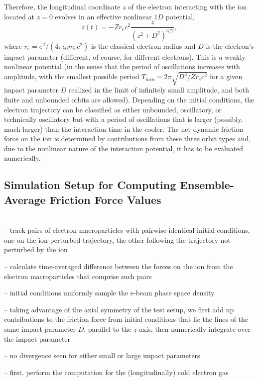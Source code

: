 \documentclass[12pt, reqno]{amsart}
\begin{document}
Therefore, the longitudinal coordinate $z$ of the electron interacting with the ion located at $z=0$ evolves in an effective nonlinear $1D$ potential, 
\begin{equation}
\ddot{z}(t) = - Zr_ec^2 \frac{z}{(z^2 +D^2)^{3/2}} ,
\end{equation}
where $r_e = e^2/(4 \pi \epsilon_0 m_e c^2)$ is the classical electron radius and $D$ is the electron's impact parameter (different, of course, for different electrons).  This is a weakly nonlinear potential (in the sense that the period of oscillations increases with amplitude, with the smallest possible period $T_{min} = 2\pi \sqrt{D^3/Zr_ec^2}$ for a given impact parameter $D$ realized in the limit of infinitely small amplitude, and both finite and unbounded orbits are allowed).  Depending on the initial conditions, the electron trajectory  can be classified as either unbounded, oscillatory, or technically oscillatory but with a period of oscillations that is larger (possibly, much larger) than the interaction time in the cooler.  The net dynamic friction force on the ion is determined by contributions from these three orbit types and, due to the nonlinear nature of the interaction potential, it has to be evaluated numerically.

\subsection{Simulation Setup for Computing Ensemble-Average Friction Force Values} 
~\\
-- track pairs of electron macroparticles with pairwise-identical initial conditions, one on the ion-perturbed trajectory, the other following the trajectory not  perturbed by the ion 

-- calculate time-averaged difference between the forces on the ion from the electron macroparticles that comprise such pairs 

-- initial conditions uniformly sample the e-beam phase space density 

-- taking advantage of the axial symmetry of the test setup, we first add up contributions to the friction force from initial conditions that lie the lines of the same impact parameter $D$, parallel to the $z$ axis, then numerically integrate over the impact parameter  

-- no divergence seen for either small or large impact parameters 


-- first, perform the computation for the (longitudinally) cold electron gas 
\end{document}
